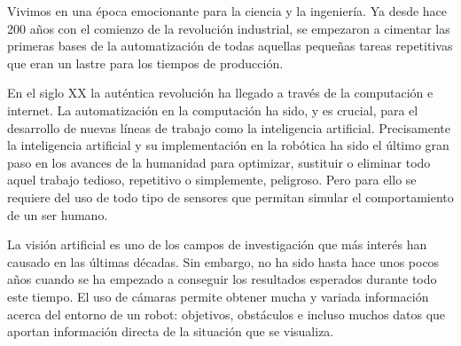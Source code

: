 

Vivimos en una época emocionante para la ciencia y la ingeniería. Ya desde hace
200 años con el comienzo de la revolución industrial, se empezaron a cimentar
las primeras bases de la automatización de todas aquellas pequeñas tareas
repetitivas que eran un lastre para los tiempos de producción.

En el siglo XX la auténtica revolución ha llegado a través de la computación e
internet. La automatización en la computación ha sido, y es crucial, para el
desarrollo de nuevas líneas de trabajo como la inteligencia artificial.
Precisamente la inteligencia artificial y su implementación en la robótica ha
sido el último gran paso en los avances de la humanidad para optimizar,
sustituir o eliminar todo aquel trabajo tedioso, repetitivo o simplemente,
peligroso. Pero para ello se requiere del uso de todo tipo de sensores que
permitan simular el comportamiento de un ser humano.

La visión artificial es uno de los campos de investigación que más interés han
causado en las últimas décadas. Sin embargo, no ha sido hasta hace unos pocos
años cuando se ha empezado a conseguir los resultados esperados durante todo
este tiempo. El uso de cámaras permite obtener mucha y variada información
acerca del entorno de un robot: objetivos, obstáculos e incluso muchos datos que
aportan información directa de la situación que se visualiza.

